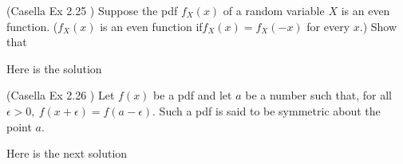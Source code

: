\documentclass[12pt,letterpaper]{exam}
\begin{document}
\begin{questions}
	\question (Casella Ex 2.25 ) Suppose the pdf  $f_X(x)$ of a random variable $X$ is an even function. ($f_X(x)$ is an even function if$f_X(x) = f_X(-x)$ for every $x$.) Show that 
	
	\begin{solution}
		Here is the solution
	\end{solution}
	
	\question  (Casella Ex 2.26 ) Let $f(x)$ be a pdf and let $a$ be a number such that, for all $\epsilon > 0, \ f(x+\epsilon) = f(a-\epsilon)$. Such a pdf is said to be symmetric about the point $a$.
	
	\begin{solution}
		Here is the next solution
	\end{solution}


\end{questions}
\end{document}
